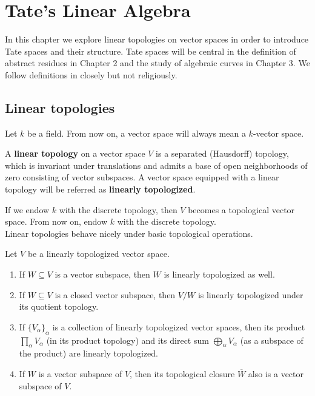 \chapter{Tate's Linear Algebra}\label{ch:tate-linear-algebra}
In this chapter we explore linear topologies on vector spaces in order to introduce Tate spaces and their structure. Tate spaces will be central in the definition of abstract residues in Chapter 2 and the study of algebraic curves in Chapter 3. We follow definitions in \cite{Chiral} closely but not religiously.
\section{Linear topologies}
Let $k$ be a field. From now on, a vector space will always mean a $k$-vector space.
\begin{definition}\label{def:linear_topology}
A \textbf{linear topology} on a vector space $V$ is a separated (Hausdorff) topology, which is invariant under translations and admits a base of open neighborhoods of zero consisting of vector subspaces. A vector space equipped with a linear topology will be referred as \textbf{linearly topologized}.
\end{definition}
If we endow $k$ with the discrete topology, then $V$ becomes a topological vector space. From now on, endow $k$ with the discrete topology. \\
Linear topologies behave nicely under basic topological operations.
\begin{theorem}\label{thm:linear_topologies_properties}
Let $V$ be a linearly topologized vector space. 
	\begin{enumerate}[label = (\alph*)]
		\item If $W \subseteq V$ is a vector subspace, then $W$ is linearly topologized as well.
		\item If $W \subseteq V$ is a closed vector subspace, then $V/W$ is linearly topologized under its quotient topology. 
		\item If $\{V_{\alpha}\}_{\alpha}$ is a collection of linearly topologized vector spaces, then its product $\prod_{\alpha} V_{\alpha}$ (in its product topology) and its direct sum $\bigoplus_{\alpha} V_{\alpha}$ (as a subspace of the product) are linearly topologized.
		\item If $W$ is a vector subspace of $V$, then its topological closure $\overline{W}$ also is a vector subspace of $V$.
	\end{enumerate}
\end{theorem}
